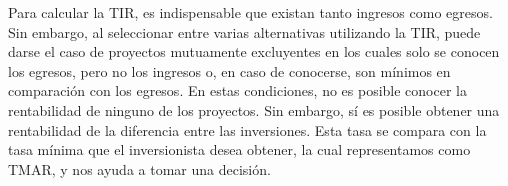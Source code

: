 Para calcular la TIR, es indispensable que existan tanto ingresos como egresos. Sin embargo, al seleccionar entre varias alternativas utilizando la TIR, puede darse el caso de proyectos mutuamente excluyentes en los cuales solo se conocen los egresos, pero no los ingresos o, en caso de conocerse, son mínimos en comparación con los egresos. En estas condiciones, no es posible conocer la rentabilidad de ninguno de los proyectos. Sin embargo, sí es posible obtener una rentabilidad de la diferencia entre las inversiones. Esta tasa se compara con la tasa mínima que el inversionista desea obtener, la cual representamos como TMAR, y nos ayuda a tomar una decisión.\\





